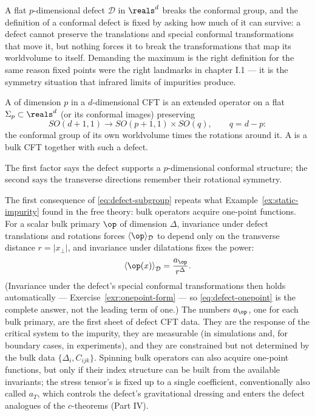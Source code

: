 A flat $p$-dimensional defect $\mathcal{D}$ in $\reals^d$ breaks the
conformal group, and the definition of a conformal defect is fixed by
asking how much of it can survive: a defect cannot preserve the
translations and special conformal transformations that move it, but
nothing forces it to break the transformations that map its worldvolume
to itself. Demanding the maximum is the right definition for the same
reason fixed points were the right landmarks in chapter I.1 --- it is
the symmetry situation that infrared limits of impurities produce.

\begin{ddefinition}
\label{def:conformal-defect}
A  of dimension $p$ in a $d$-dimensional CFT is
an extended operator on a flat $\Sigma_p \subset \reals^d$ (or its
conformal images) preserving
\begin{equation}
SO(d+1, 1) \longrightarrow SO(p+1, 1) \times SO(q),
\qquad q = d - p :
\label{eq:defect-subgroup}
\end{equation}
the conformal group of its own worldvolume times the rotations around
it. A  is a bulk CFT together with such a defect.
\end{ddefinition}

\noin The first factor says the defect supports a $p$-dimensional
conformal structure; the second says the transverse directions remember
their rotational symmetry.

The first consequence of \eqref{eq:defect-subgroup} repeats what
Example~\ref{ex:static-impurity} found in the free theory: bulk
operators acquire one-point functions. For a scalar bulk primary $\op$
of dimension $\Delta$, invariance under defect translations and
rotations forces $\langle\op\rangle_{\mathcal D}$ to depend only on the
transverse distance $r = |x_\perp|$, and invariance under dilatations
fixes the power:
\begin{equation}
\left\langle \op(x) \right\rangle_{\mathcal D}
= \frac{a_{\op}}{r^{\Delta}} .
\label{eq:defect-onepoint}
\end{equation}
(Invariance under the defect's special conformal transformations then
holds automatically --- Exercise~\ref{exr:onepoint-form} --- so
\eqref{eq:defect-onepoint} is the complete answer, not the leading
term of one.) The numbers $a_{\op}$, one for each bulk primary, are the
first sheet of defect CFT data. They are the response of the critical
system to the impurity, they are measurable (in simulations and, for
boundary cases, in experiments), and they are constrained but not
determined by the bulk data $\{\Delta_i, C_{ijk}\}$. Spinning bulk
operators can also acquire one-point functions, but only if their
index structure can be built from the available invariants; the stress
tensor's is fixed up to a single coefficient, conventionally also
called $a_T$, which controls the defect's gravitational dressing and
enters the defect analogues of the $c$-theorems (Part IV).

